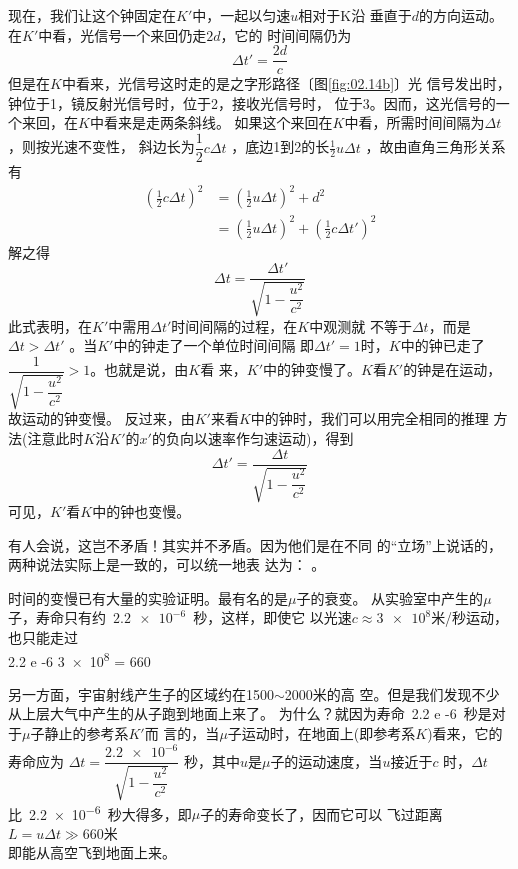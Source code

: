 现在，我们让这个钟固定在$K'$中，一起以匀速$u$相对于K沿
垂直于$d$的方向运动。在$K'$中看，光信号一个来回仍走$2d$，它的
时间间隔仍为
\begin{equation*}
    \Delta t ' = \frac { 2 d } { c }
\end{equation*}
但是在$K$中看来，光信号这时走的是之字形路径〔图\ref{fig:02.14b}〕光
信号发出时，钟位于1，镜反射光信号时，位于2，接收光信号时，
位于3。因而，这光信号的一个来回，在$K$中看来是走两条斜线。
如果这个来回在$K$中看，所需时间间隔为$\Delta t$，则按光速不变性，
斜边长为$\dfrac { 1 } { 2 } c \Delta t $ ，底边1到2的长$\frac { 1 } { 2 } u \Delta t$  ，故由直角三角形关系
有
\begin{align*}
    \left( \frac { 1 } { 2 } c \Delta t \right) ^ { 2 } &= \left( \frac { 1 } { 2 } u \Delta t \right) ^ { 2 } + d ^ { 2 } \\
&= \left( \frac { 1 } { 2 } u \Delta t \right) ^ { 2 } + \left( \frac { 1 } { 2 } c \Delta t ' \right) ^ { 2 }
\end{align*}
解之得
\begin{equation}\label{eqn:02.07.01}
    \Delta t = \frac { \Delta t ' } { \sqrt { 1 - \dfrac { u ^ 2 } { c ^ { 2 } } } }
\end{equation}
此式表明，在$K'$中需用$\Delta t '$时间间隔的过程，在$K$中观测就
不等于$\Delta t$，而是$\Delta t > \Delta t '$ 。当$K'$中的钟走了一个单位时间间隔
即$ \Delta t ' = 1  $时，$K$中的钟已走了
$\dfrac { 1 } { \sqrt { 1 - \dfrac { u ^ 2 } { c ^ { 2 } } } } > 1$。也就是说，由$K$看
来，$K'$中的钟变慢了。$K$看$K'$的钟是在运动，故运动的钟变慢。
反过来，由$K'$来看$K$中的钟时，我们可以用完全相同的推理
方法(注意此时$K$沿$K'$的$x'$的负向以速率作匀速运动)，得到
\begin{equation}\label{eqn:02.07.02}
    \Delta t ' = \dfrac { \Delta t } { \sqrt { 1 - \dfrac { u ^ 2 } { c ^ { 2 } } } }
\end{equation}
可见，$K'$看$K$中的钟也变慢。

有人会说，这岂不矛盾！其实并不矛盾。因为他们是在不同
的“立场”上说话的，两种说法实际上是一致的，可以统一地表
达为： 。

时间的变慢已有大量的实验证明。最有名的是$\mu$子的衰变。
从实验室中产生的$\mu$子，寿命只有约~$\num{2.2e-6}$~秒，这样，即使它
以光速$ c \approx \num{3e8} $米/秒运动，也只能走过\\
\mbox{}\hspace{6em}\num{2.2 e -6} \times \num{3e8} = 660 

\vspace{-0.2em}另一方面，宇宙射线产生子的区域约在1500$\sim$2000米的高
空。但是我们发现不少从上层大气中产生的从子跑到地面上来了。
为什么？就因为寿命~\num{2.2 e -6}~秒是对于$\mu$子静止的参考系$K'$而
言的，当$\mu$子运动时，在地面上(即参考系$K$)看来，它的寿命应为
$\Delta t = \dfrac { \num{2.2e-6}}{ \sqrt { 1 - \dfrac { u ^ 2 } { c ^ { 2 } } } }$
秒，其中$u$是$\mu$子的运动速度，当$u$接近于$c$
时，$\Delta t$比~\num{2.2e-6}~秒大得多，即$\mu$子的寿命变长了，因而它可以
飞过距离\\
\mbox{}\hspace{6em}$L = u \Delta t \gg 660 \text{米}$\\
即能从高空飞到地面上来。

